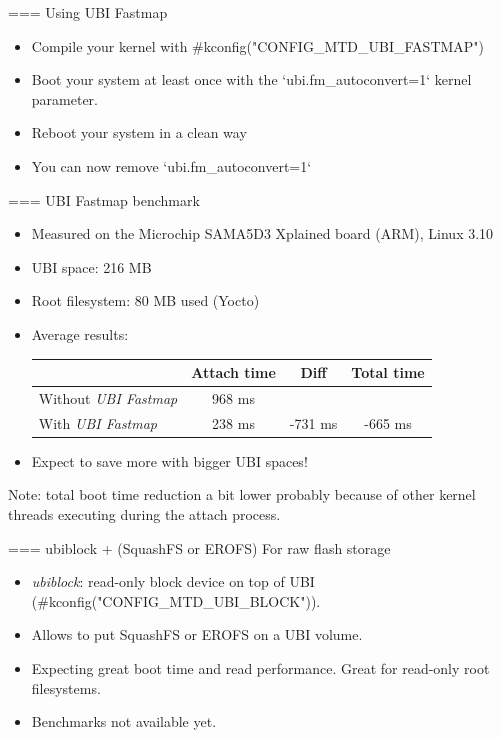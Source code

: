 === Using UBI Fastmap
\begin{itemize}
\item Compile your kernel with #kconfig("CONFIG_MTD_UBI_FASTMAP")
\item Boot your system at least once with the
      `ubi.fm_autoconvert=1` kernel parameter.
\item Reboot your system in a clean way
\item You can now remove `ubi.fm_autoconvert=1`
\end{itemize}


=== UBI Fastmap benchmark
\begin{itemize}
\item Measured on the Microchip SAMA5D3 Xplained board (ARM), Linux 3.10
\item UBI space: 216 MB
\item Root filesystem: 80 MB used (Yocto)
\item Average results:
    \newline \newline
    \begin{tabular}{| l || c | c | c |}
    \hline
    & Attach time & Diff & Total time\\
    \hline
    Without {\em UBI Fastmap} & 968 ms & & \\
    With {\em UBI Fastmap} & 238 ms & -731 ms & -665 ms \\
    \hline
    \end{tabular}
    \newline
\item Expect to save more with bigger UBI spaces!
\end{itemize}
Note: total boot time reduction a bit lower probably because of other kernel threads executing during the attach process.


=== ubiblock + (SquashFS or EROFS)
For raw flash storage
\begin{itemize}
\item {\em ubiblock}: read-only block device on top of UBI
      (#kconfig("CONFIG_MTD_UBI_BLOCK")).
\item Allows to put SquashFS or EROFS on a UBI volume.
\item Expecting great boot time and read performance. Great
      for read-only root filesystems.
\item Benchmarks not available yet.
\end{itemize}



